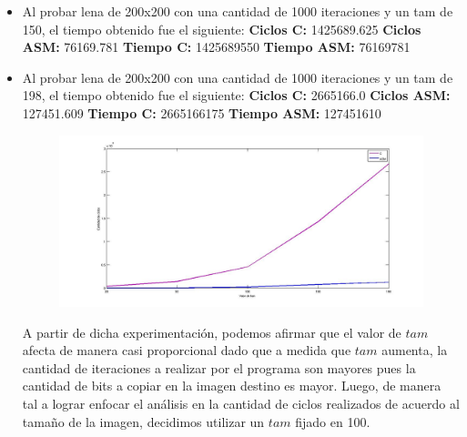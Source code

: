 \documentclass[10pt, a4paper]{article}
\begin{document}
\begin{itemize}
\begin{itemize}
\item{Al probar lena de 200x200 con una cantidad de 1000 iteraciones y un tam de 150, el tiempo obtenido fue el siguiente:\newline
\newline
\textbf{Ciclos C:}                 1425689.625\newline
\vspace{0.15cm}
\textbf{Ciclos ASM:}               76169.781\newline
\textbf{Tiempo C:}                 1425689550\newline
\textbf{Tiempo ASM:}               76169781\newline}

\item{Al probar lena de 200x200 con una cantidad de 1000 iteraciones y un tam de 198, el tiempo obtenido fue el siguiente:\newline
\newline
\textbf{Ciclos C:}                 2665166.0\newline
\vspace{0.15cm}
\textbf{Ciclos ASM:}               127451.609\newline
\textbf{Tiempo C:}                 2665166175\newline
\textbf{Tiempo ASM:}               127451610\newline}


\begin{figure}[H] %
\begin{center}
\includegraphics[width=560pt]{./variacionTam.jpg}
\end{center}
\end{figure}

A partir de dicha experimentación, podemos afirmar que el valor de $tam$ afecta de manera casi proporcional dado que a medida que $tam$ aumenta, la cantidad de iteraciones a realizar por el programa son mayores pues la cantidad de bits a copiar en la imagen destino es mayor. Luego, de manera tal a lograr enfocar el análisis en la cantidad de ciclos realizados de acuerdo al tamaño de la imagen, decidimos utilizar un $tam$ fijado en 100.\newline 


\end{itemize}
\end{itemize}
\end{document}
